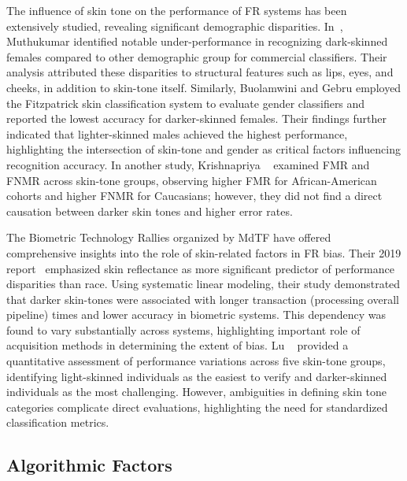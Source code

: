 The influence of skin tone on the performance of FR systems has been extensively
studied, revealing significant demographic disparities.
In~\cite{muthukumar2018understanding}, Muthukumar \etal identified notable
under-performance in recognizing dark-skinned females compared to other
demographic group for commercial classifiers. Their analysis attributed these
disparities to structural features such as lips, eyes, and cheeks, in addition
to skin-tone itself. Similarly, Buolamwini and Gebru \cite{buolamwini18a}
employed the Fitzpatrick skin classification system to evaluate gender
classifiers and reported the lowest accuracy for darker-skinned females. Their
findings further indicated that lighter-skinned males achieved the highest
performance, highlighting the intersection of skin-tone and gender as critical
factors influencing recognition accuracy. In another study, Krishnapriya
\etal~\cite{krishnapriya2020issues} examined FMR and FNMR across skin-tone
groups, observing higher FMR for African-American cohorts and higher FNMR for
Caucasians; however, they did not find a direct causation between darker skin
tones and higher error rates.

The Biometric Technology Rallies organized by MdTF have offered comprehensive
insights into the role of skin-related factors in FR bias. Their 2019
report~\cite{cook2019demographic} emphasized skin reflectance as more
significant predictor of performance disparities than race. Using systematic
linear modeling, their study demonstrated that darker skin-tones were associated
with longer transaction (processing overall pipeline) times and lower accuracy
in biometric systems. This dependency was found to vary substantially across
systems, highlighting important role of acquisition methods in determining the
extent of bias. Lu \etal~\cite{lu2019experimental} provided a quantitative
assessment of performance variations across five skin-tone groups, identifying
light-skinned individuals as the easiest to verify and darker-skinned
individuals as the most challenging. However, ambiguities in defining skin tone
categories complicate direct evaluations, highlighting the need for standardized
classification metrics.

\subsection{Algorithmic Factors}

